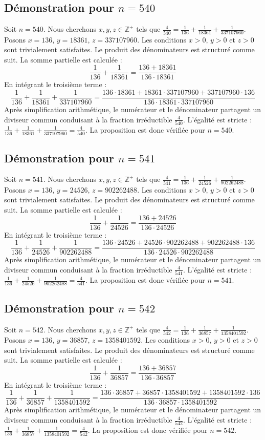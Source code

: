 \documentclass[11pt,a4paper]{article}
\begin{document}
\subsection{Démonstration pour $n = 540$}
Soit $n = 540$. Nous cherchons $x, y, z \in \mathbb{Z}^{+}$ tels que $\frac{4}{540} = \frac{1}{136} + \frac{1}{18361} + \frac{1}{337107960}$.
Posons $x = 136$, $y = 18361$, $z = 337107960$.
Les conditions $x > 0$, $y > 0$ et $z > 0$ sont trivialement satisfaites.
Le produit des dénominateurs est structuré comme suit. La somme partielle est calculée :
$$ \frac{1}{136} + \frac{1}{18361} = \frac{136+18361}{136 \cdot 18361} $$
En intégrant le troisième terme :
$$ \frac{1}{136} + \frac{1}{18361} + \frac{1}{337107960} = \frac{136 \cdot 18361 + 18361 \cdot 337107960 + 337107960 \cdot 136}{136 \cdot 18361 \cdot 337107960} $$
Après simplification arithmétique, le numérateur et le dénominateur partagent un diviseur commun conduisant à la fraction irréductible $\frac{4}{540}$.
L'égalité est stricte : $\frac{1}{136} + \frac{1}{18361} + \frac{1}{337107960} = \frac{4}{540}$.
La proposition est donc vérifiée pour $n = 540$.
\subsection{Démonstration pour $n = 541$}
Soit $n = 541$. Nous cherchons $x, y, z \in \mathbb{Z}^{+}$ tels que $\frac{4}{541} = \frac{1}{136} + \frac{1}{24526} + \frac{1}{902262488}$.
Posons $x = 136$, $y = 24526$, $z = 902262488$.
Les conditions $x > 0$, $y > 0$ et $z > 0$ sont trivialement satisfaites.
Le produit des dénominateurs est structuré comme suit. La somme partielle est calculée :
$$ \frac{1}{136} + \frac{1}{24526} = \frac{136+24526}{136 \cdot 24526} $$
En intégrant le troisième terme :
$$ \frac{1}{136} + \frac{1}{24526} + \frac{1}{902262488} = \frac{136 \cdot 24526 + 24526 \cdot 902262488 + 902262488 \cdot 136}{136 \cdot 24526 \cdot 902262488} $$
Après simplification arithmétique, le numérateur et le dénominateur partagent un diviseur commun conduisant à la fraction irréductible $\frac{4}{541}$.
L'égalité est stricte : $\frac{1}{136} + \frac{1}{24526} + \frac{1}{902262488} = \frac{4}{541}$.
La proposition est donc vérifiée pour $n = 541$.
\subsection{Démonstration pour $n = 542$}
Soit $n = 542$. Nous cherchons $x, y, z \in \mathbb{Z}^{+}$ tels que $\frac{4}{542} = \frac{1}{136} + \frac{1}{36857} + \frac{1}{1358401592}$.
Posons $x = 136$, $y = 36857$, $z = 1358401592$.
Les conditions $x > 0$, $y > 0$ et $z > 0$ sont trivialement satisfaites.
Le produit des dénominateurs est structuré comme suit. La somme partielle est calculée :
$$ \frac{1}{136} + \frac{1}{36857} = \frac{136+36857}{136 \cdot 36857} $$
En intégrant le troisième terme :
$$ \frac{1}{136} + \frac{1}{36857} + \frac{1}{1358401592} = \frac{136 \cdot 36857 + 36857 \cdot 1358401592 + 1358401592 \cdot 136}{136 \cdot 36857 \cdot 1358401592} $$
Après simplification arithmétique, le numérateur et le dénominateur partagent un diviseur commun conduisant à la fraction irréductible $\frac{4}{542}$.
L'égalité est stricte : $\frac{1}{136} + \frac{1}{36857} + \frac{1}{1358401592} = \frac{4}{542}$.
La proposition est donc vérifiée pour $n = 542$.
\end{document}
